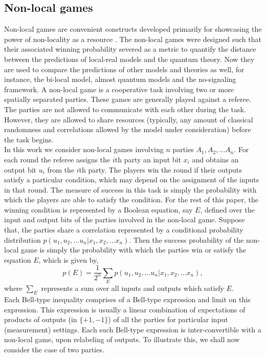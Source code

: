 \documentclass[%
 reprint,
 amsmath,amssymb,
 aps,
]{revtex4-1}
\theoremstyle{plain}
\begin{document}
\subsection{Non-local games}
Non-local games are convenient constructs developed primarily for showcasing the power of non-locality as a resource \cite{ambainis2013worst,brunner2014bell}.
The non-local games were designed such that their associated winning probability severed as a metric to quantify the distance between the predictions of local-real models and the quantum theory. Now they are used to compare the predictions of other models and theories as well, for instance, the bi-local model, almost quantum models and the no-signaling framework. A non-local game is a cooperative task involving two or more spatially separated parties. These games are generally played against a referee. The parties are not allowed to communicate with each other during the task. However, they are allowed to share resources (typically, any amount of classical randomness and correlations allowed by the model under consideration) before the task begins. \\ 
In this work we consider non-local games involving $n$ parties $A_1,A_2,\ldots A_n$. For each round the referee assigns the $i$th party an input bit $x_i$ and obtains an output bit $u_i$ from the $i$th party. The players win the round if their outputs satisfy a particular condition, which may depend on the assignment of the inputs in that round. The measure of success in this task is simply the probability with which the players are able to satisfy the condition.
For the rest of this paper, the winning condition is represented by a Boolean equation, say $E$, defined over the input and output bits of the parties involved in the non-local game. Suppose that, the parties share a correlation represented by a conditional probability distribution $p(u_1,u_2,\ldots u_n|x_1,x_2,\ldots x_n)$. Then the success probability of the non-local game is simply the probability with which the parties win or satisfy the equation $E$, which is given by,  
\begin{equation}
p(E)=\frac{1}{2^n}\sum_{E}p(u_1,u_2,\ldots u_n|x_1,x_2,\ldots x_n),
\end{equation}
where $\sum_{E}$ represents a sum over all inputs and outputs which satisfy $E$.\\
Each Bell-type inequality comprises of a Bell-type expression and limit on this expression. This expression is usually a linear combination of expectations of products of outputs (in $\{+1,-1\}$) of all the parties for particular input (measurement) settings. Each such Bell-type expression is inter-convertible with a non-local game, upon relabeling of outputs. To illustrate this, we shall now consider the case of two parties. 
\end{document}
